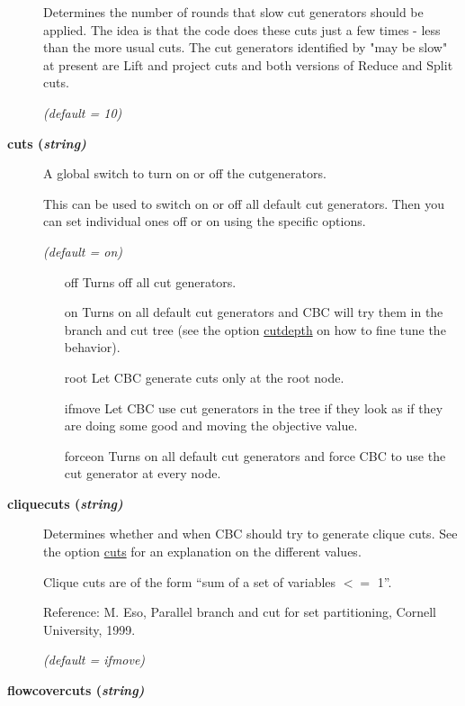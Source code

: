\begin{description}
Determines the number of rounds that slow cut generators should be applied.
The idea is that the code does these cuts just a few times - less than the more usual cuts.
The cut generators identified by "may be slow" at present are Lift and project cuts and both versions of Reduce and Split cuts.

\textsl{(default = 10)}

\item[\label{cuts}\hypertarget{cuts}
{\textbf{cuts (\slshape{string})}}]\hspace{1.0in}

A global switch to turn on or off the cutgenerators.

This can be used to switch on or off all default cut generators.
Then you can set individual ones off or on using the specific options.

\textsl{(default = on)}
\begin{itemize}
\item[off] 
Turns off all cut generators.
\item[on] 
Turns on all default cut generators and CBC will try them in the branch and cut tree (see the option \hyperlink{cutdepth}{cutdepth} on how to fine tune the behavior).
\item[root] 
Let CBC generate cuts only at the root node.
\item[ifmove] 
Let CBC use cut generators in the tree if they look as if they are doing some good and moving the objective value.
\item[forceon] 
Turns on all default cut generators and force CBC to use the cut generator at every node.
\end{itemize}

\item[\label{cliquecuts}\hypertarget{cliquecuts}
{\textbf{cliquecuts (\slshape{string})}}]\hspace{1.0in}

Determines whether and when CBC should try to generate clique cuts.
See the option \hyperlink{cuts}{cuts} for an explanation on the different values.

Clique cuts are of the form ``sum of a set of variables $<=$ 1''.

Reference: M. Eso, Parallel branch and cut for set partitioning, Cornell University, 1999.

\textsl{(default = ifmove)}

\item[\label{flowcovercuts}\hypertarget{flowcovercuts}
{\textbf{flowcovercuts (\slshape{string})}}]\hspace{1.0in}


\end{description}
